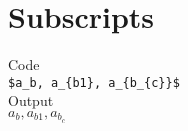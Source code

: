 \documentclass{article}
\begin{document}
\section{Subscripts}
Code\\
\verb!$a_b, a_{b1}, a_{b_{c}}$! \\
Output\\
$a_b, a_{b1}, a_{b_{c}}$
\end{document}
